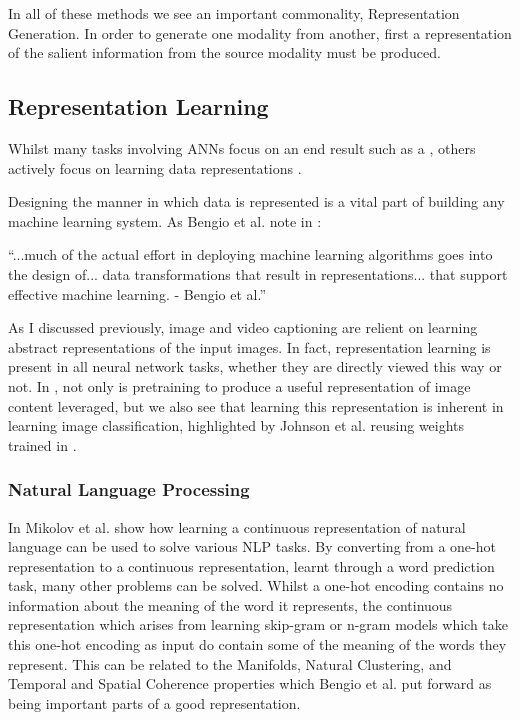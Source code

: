 In all of these methods we see an important commonality, Representation Generation. In order to generate one modality from another, first a representation of the salient information from the source modality must be produced.

\subsection{Representation Learning}

Whilst many tasks involving \ac{ANN}s focus on an end result such as a \cite{krizhevsky2012imagenet}, others actively focus on learning data representations \cite{radford2015unsupervised, silberer2014learning, wavenet, vincent2010stacked, mikolov2013distributed, mikolov2013efficient, mikolov2013linguistic, feng2010visual, eslami2018neural, donahue2019large}.

Designing the manner in which data is represented is a vital part of building any machine learning system. As Bengio et al. note in \cite{repRev}:

\begin{displayquote}
``...much of the actual effort in deploying machine learning algorithms goes into the design of... data transformations that result in representations... that support effective machine learning. - Bengio et al.''
\end{displayquote}

As I discussed previously, image and video captioning are relient on learning abstract representations of the input images. In fact, representation learning is present in all neural network tasks, whether they are directly viewed this way or not. In \cite{vinyals2015show, venugopalan2014translating, johnson2016densecap}, not only is pretraining to produce a useful representation of image content leveraged, but we also see that learning this representation is inherent in learning image classification, highlighted by Johnson et al. \cite{johnson2016densecap} reusing weights trained in \cite{simonyan2014very}. 

\subsubsection{Natural Language Processing}
In \cite{mikolov2013distributed, mikolov2013efficient, mikolov2013linguistic} Mikolov et al. show how learning a continuous representation of natural language can be used to solve various \ac{NLP} tasks. By converting from a one-hot representation to a continuous representation, learnt through a word prediction task, many other problems can be solved. 
Whilst a one-hot encoding contains no information about the meaning of the word it represents, the continuous representation which arises from learning skip-gram or n-gram models which take this one-hot encoding as input do contain some of the meaning of the words they represent. This can be related to the Manifolds, Natural Clustering, and Temporal and Spatial Coherence properties which Bengio et al. \cite{repRev} put forward as being important parts of a good representation.

